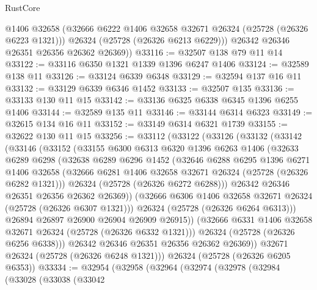 \begin{lexlean}{RustCore}
\begin{coremodule}
          @1406
          @32658
          (@32666 @6222 @1406 @32658 @32671 @26324 (@25728 (@26326 @6223 @1321)))
          @26324
          (@25728 (@26326 @6213 @6229)))
        @26342
        @26346
        @26351
        @26356
        @26362
        @26369))
@33116 := @32507 @138 @79 @11 @14
@33122 := @33116 @6350 @1321 @1339 @1396 @6247 @1406
@33124 := @32589 @138 @11
@33126 := @33124 @6339 @6348
@33129 := @32594 @137 @16 @11
@33132 := @33129 @6339 @6346 @1452
@33133 := @32507 @135
@33136 := @33133 @130 @11 @15
@33142 := @33136 @6325 @6338 @6345 @1396 @6255 @1406
@33144 := @32589 @135 @11
@33146 := @33144 @6314 @6323
@33149 := @32615 @134 @16 @11
@33152 := @33149 @6314 @6321 @1739
@33155 := @32622 @130 @11 @15
@33256 := @33112
    (@33122
      (@33126
        (@33132
          (@33142
            (@33146
              (@33152
                (@33155
                  @6300
                  @6313
                  @6320
                  @1396
                  @6263
                  @1406
                  (@32633
                    @6289
                    @6298
                    (@32638
                      @6289
                      @6296
                      @1452
                      (@32646
                        @6288
                        @6295
                        @1396
                        @6271
                        @1406
                        @32658
                        (@32666 @6281 @1406 @32658 @32671 @26324 (@25728 (@26326 @6282 @1321)))
                        @26324
                        (@25728 (@26326 @6272 @6288)))
                      @26342
                      @26346
                      @26351
                      @26356
                      @26362
                      @26369))
                  (@32666 @6306 @1406 @32658 @32671 @26324 (@25728 (@26326 @6307 @1321)))
                  @26324
                  (@25728 (@26326 @6264 @6313)))
                @26894
                @26897
                @26900
                @26904
                @26909
                @26915))
            (@32666 @6331 @1406 @32658 @32671 @26324 (@25728 (@26326 @6332 @1321)))
            @26324
            (@25728 (@26326 @6256 @6338)))
          @26342
          @26346
          @26351
          @26356
          @26362
          @26369))
      @32671
      @26324
      (@25728 (@26326 @6248 @1321)))
    @26324
    (@25728 (@26326 @6205 @6353))
@33334 := @32954
    (@32958
      (@32964
        (@32974
          (@32978
            (@32984
              (@33028
                (@33038
                  (@33042

\end{coremodule}
\end{lexlean}
